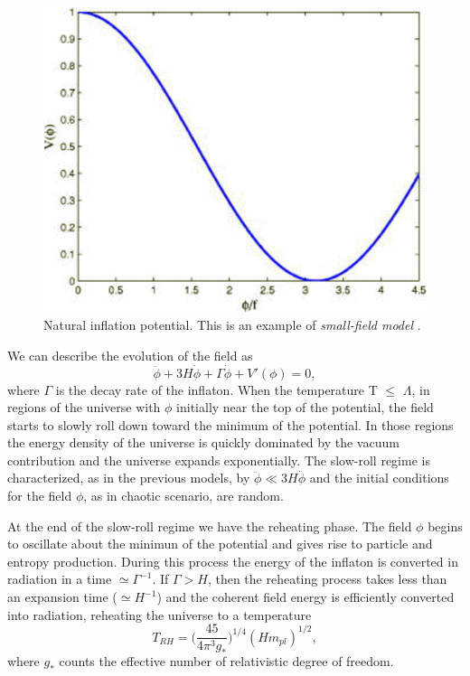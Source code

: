 \documentclass[11pt,a4paper,twoside]{book}
\begin{document}
 \begin{figure}
 	\centering
 	\includegraphics[width=0.5\linewidth, height=0.25\textheight]{"Images/Chap2/NaturalInflation_InflationDynamics and reheating"}
 	\caption{Natural inflation potential. This is an example of \textit{small-field model} \cite{InflationDynamicsAndReheating:chap1}.}
 	\label{fig:naturalinflationinflationdynamics-and-reheating}
 \end{figure}
  We can describe the evolution of the field as 
 \begin{equation}
 	\label{Chap2:eomSmallFieldModel}
 	\ddot{\phi} + 3H\dot{\phi} + \Gamma\dot{\phi} + V'(\phi) = 0,
 \end{equation} 
where $\Gamma$ is the decay rate of the inflaton.
When the temperature T $\le$ $\Lambda$, in regions of the universe with $\phi$ initially near the top of the potential, the field starts to slowly roll down toward the minimum of the potential. In those regions the energy density of the universe is quickly dominated by the vacuum contribution and the universe expands exponentially. The slow-roll regime is characterized,  as in the previous models, by $ \ddot{\phi} \ll 3H\dot{\phi} $ and the initial conditions for the field $\phi$, as in chaotic scenario, are random. 

At the end of the slow-roll regime we have the reheating phase. The field $\phi$ begins to oscillate about the minimun of the potential and gives rise to particle and entropy production. 
During this process the energy of the inflaton is converted in radiation in a time $\simeq \Gamma^{-1}$. If $\Gamma > H$, then the reheating process takes less than an expansion time ($\simeq H^{-1}$) and the coherent field energy is efficiently converted into radiation, reheating the universe to a temperature \cite{Chap2:NaturalInflation_Turner_Steinhardt}
\begin{equation}
\label{Chap2:ReheatingTemperatureSmallFieldModel}
T_{RH}=\Big (\frac{45}{4\pi^{3}g_{*}}\Big )^{1/4} (Hm_{pl})^{1/2},
\end{equation}
where $ g_{*} $ counts the effective number of relativistic degree of freedom.
\end{document}
